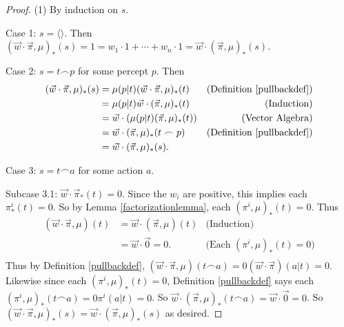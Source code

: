 \documentclass[runningheads]{llncs}
\begin{document}
\begin{proof}
    (1) By induction on $s$.

    Case 1: $s=\langle\rangle$. Then
    $(\vec w\cdot\vec\pi,\mu)_*(s)=1=w_1\cdot 1+\cdots+w_n\cdot 1
    =\vec w\cdot (\vec\pi,\mu)_*(s)$.

    Case 2: $s=t\frown p$ for some percept $p$. Then
    \begin{align*}
        (\vec w\cdot \vec\pi,\mu)_*(s)
            &= \mu(p|t)(\vec w\cdot\vec\pi,\mu)_*(t)
                &\mbox{(Definition \ref{pullbackdef})}\\
            &= \mu(p|t)\vec w\cdot(\vec\pi,\mu)_*(t)
                &\mbox{(Induction)}\\
            &= \vec w\cdot(\mu(p|t)(\vec\pi,\mu)_*(t))
                &\mbox{(Vector Algebra)}\\
            &= \vec w\cdot(\vec\pi,\mu)_*(t\frown p)
                &\mbox{(Definition \ref{pullbackdef})}\\
            &= \vec w\cdot(\vec\pi,\mu)_*(s).
    \end{align*}

    Case 3: $s=t\frown a$ for some action $a$.

    Subcase 3.1: $\vec w\cdot \vec\pi_*(t)=0$.
        Since the $w_i$ are positive, this implies each
        $\pi^i_*(t)=0$. So by Lemma \ref{factorizationlemma},
        each $(\pi^i,\mu)_*(t)=0$.
        Thus
        \begin{align*}
            (\vec w\cdot\vec\pi,\mu)(t)
                &= \vec w\cdot(\vec\pi,\mu)(t)
                    &\mbox{(Induction)}\\
                &= \vec w\cdot\vec 0=0.
                    &\mbox{(Each $(\pi^i,\mu)_*(t)=0$)}\\
        \end{align*}
        Thus by Definition \ref{pullbackdef},
        $(\vec w\cdot\vec\pi,\mu)(t\frown a)=0(\vec w\cdot\vec\pi)(a|t)=0$.
        Likewise since each $(\pi^i,\mu)_*(t)=0$, Definition \ref{pullbackdef}
        says each $(\pi^i,\mu)_*(t\frown a)=0\pi^i(a|t)=0$.
        So $\vec w\cdot(\vec\pi,\mu)_*(t\frown a)=\vec w\cdot\vec 0=0$.
        So $(\vec w\cdot\vec\pi,\mu)_*(s)=\vec w\cdot(\vec\pi,\mu)_*(s)$
        as desired.


\end{proof}
\end{document}
